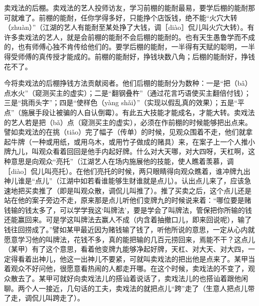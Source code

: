 \documentclass[12pt,UTF8]{ctexbook}
\begin{document}
卖戏法的后棚。卖戏法的艺人投师访友，学习前棚的能耐最易，要学后棚的能耐那可就难了。前棚的能耐，任你学得多好，只能挣个店饭钱，绝不能“火穴大转（zhuàn）”（江湖的艺人有能耐至某处挣了大钱，调［diào］侃儿叫火穴大转）。有许多卖戏法的艺人，就是会前棚的能耐不会后棚的能耐的。也有天生愚鲁学而不成的，也有师傅心独不肯传给他们的。要学后棚的能耐，一半得有天赋的聪明，一半得受师傅的真传授才能成的。前棚的能耐好，挣钱块数八角；后棚的能耐好，挣钱花不了。

今将卖戏法的后棚挣钱方法贡献阅者。他们后棚的能耐分为数种：一是“把（bǎ）点水火”（窥测买主的虚实）；二是“翻钢叠杵”（通过花言巧语使买主翻倍付钱）；三是“挑雨头字”；四是“使样色（yàng shǎi）”（实现以假乱真的效果）；五是“平点”（施展手段让被骗的人自认倒霉）。有此五大技能才能成名，才能大转。卖戏法的艺人若是把（bǎ）点（窥测买主的虚实），必须在作前棚的时候能够把出点来。譬如卖戏法的在挑（tiǎo）完了幅子（传单）的时候，见观众围着不走，他们就拿起牛牌（一种或用纸，或用乌木，或用竹子做成的赌具）来，在案子上一个人推小牌九儿，叫观众看着回回是他手内起好牌。什么对大天哪，对大四呀，天杠啊，这种意思是向观众“亮托”（江湖艺人在场内施展他的技能，使人瞧着羡慕，调［diào］侃儿叫亮托）。在他们亮托的时候，两只眼睛得向观众瞧着，谁冲牌九出神儿谁是“点儿”（江湖中如若看谁能够生财谁就是点儿）。认出点儿来了，应该急速地把买卖推了（即是叫观众散，调侃儿叫推了）。推了买卖之后，这个点儿还是站在他的案子旁边不走，原来那是点儿听他们变牌九的时候说来着：“哪位要是赌钱输的钱太多了，可以学学我这‘叫牌法’，要是学会了叫牌法，管保把你所输的钱还能赢回来。可是学这叫牌法去赢人不成（内含着抽撤口儿，即来回说呢），输了钱往回捞成了。”譬如某甲最近因为赌钱输了钱了，听他所说的意思，一定从心内就愿意学习他的叫牌法，花钱不多，真的能把输的几百元捞回来，焉能不干？这点儿（某甲）有了这个意思，看着他变牌九能够净起好牌，天杠、对大天、对大四，一定得看着出神儿，他这一出神儿不要紧，可就叫卖戏法的把出他是点来了。某甲当着观众不好问他，很愿意看热闹的人都走开哪。在这个时候，卖戏法的不变了，观众散去了。某甲可就好向卖戏法儿的搭讪着说话了，卖戏法儿的也搭讪着跟他闲聊。两个人一接近，几句话的工夫，卖戏法的就把点儿“跨”走了（生意人把点儿带了走，调侃儿叫跨走了）。
\end{document}
